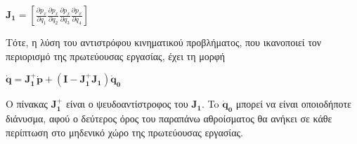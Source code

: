 \documentclass[a4paper, 11pt, english, greek]{article}
\begin{document}
\begin{center}
	$\mathbf{J_{1}} = [\frac{\partial p_{x}}{\partial q_{1}} \frac{\partial p_{x}}{\partial q_{2}}
	                   \frac{\partial p_{x}}{\partial q_{3}} \frac{\partial p_{x}}{\partial q_{4}}]$
\end{center}
Τότε, η λύση του αντιστρόφου κινηματικού προβλήματος, που ικανοποιεί τον περιορισμό της πρωτεύουσας εργασίας,
έχει τη μορφή

\begin{center}
	$\mathbf{\dot{q}} = \mathbf{J_{1}^{+}} \mathbf{\dot{p}} +
	         (\mathbf{I} - \mathbf{J_{1}^{+}} \mathbf{J_{1}}) \mathbf{\dot{q}_{0}}$
\end{center}
Ο πίνακας $\mathbf{J_{1}^{+}}$ είναι ο ψευδοαντίστροφος του $\mathbf{J_{1}}$.
To $\mathbf{\dot{q}_{0}}$ μπορεί να είναι οποιοδήποτε διάνυσμα, αφού ο δεύτερος όρος του παραπάνω αθροίσματος θα ανήκει
σε κάθε περίπτωση στο μηδενικό χώρο της πρωτεύουσας εργασίας.
\end{document}
